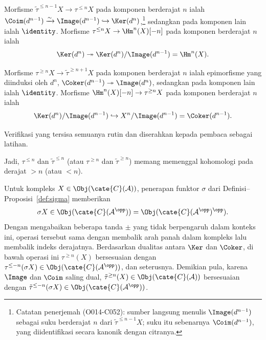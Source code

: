 \begin{bukti}
	Morfisme $\tilde{\tau}^{\leq n-1} X \to \tau^{\leq n} X$ pada komponen
	berderajat $n$ ialah $\Coim(d^{n-1}) \xrightarrow{\sim}
	\Image(d^{n-1}) \hookrightarrow \Ker(d^n)$,\footnote{Catatan penerjemah
	(O014-C052): sumber langsung menulis $\Image(d^{n-1})$ sebagai suku
	berderajat $n$ dari $\tilde{\tau}^{\leq n-1}X$; suku itu sebenarnya
	$\Coim(d^{n-1})$, yang diidentifikasi secara kanonik dengan citranya.}
	sedangkan pada komponen lain ialah $\identity$. Morfisme
	$\tau^{\leq n} X \to \Hm^n(X)[-n]$ pada komponen berderajat $n$ ialah
	\[ \Ker(d^n) \twoheadrightarrow \Ker(d^n)/\Image(d^{n-1}) = \Hm^n(X). \]
	
	Morfisme $\tau^{\geq n} X \to \tilde{\tau}^{\geq n+1} X$ pada komponen
	berderajat $n$ ialah epimorfisme yang diinduksi oleh $d^n$,
	$\Coker(d^{n-1}) \twoheadrightarrow \Image(d^n)$, sedangkan pada komponen
	lain ialah $\identity$. Morfisme
	$\Hm^n(X)[-n] \to \tau^{\geq n} X$ pada komponen berderajat $n$ ialah
	\[ \Ker(d^n)/\Image(d^{n-1}) \hookrightarrow X^n/\Image(d^{n-1}) = \Coker(d^{n-1}). \]
	
	Verifikasi yang tersisa semuanya rutin dan diserahkan kepada pembaca
	sebagai latihan.
\end{bukti}

Jadi, $\tau^{\leq n}$ dan $\tilde{\tau}^{\leq n}$ (atau
$\tau^{\geq n}$ dan $\tilde{\tau}^{\geq n}$) memang memenggal kohomologi
pada derajat $> n$ (atau $< n$).

\begin{catatan}\label{rem:truncation-sigma}
	Untuk kompleks $X \in \Obj(\cate{C}(\mathcal{A}))$, penerapan funktor
	$\sigma$ dari Definisi--Proposisi~\ref{def:sigma} memberikan
	\[
	\sigma X \in \Obj(\cate{C}(\mathcal{A}^{\opp})) =
	\Obj(\cate{C}(\mathcal{A}^{\opp})^{\opp}).
	\]
	Dengan mengabaikan beberapa
	tanda $\pm$ yang tidak berpengaruh dalam konteks ini, operasi tersebut sama
	dengan membalik arah panah dalam kompleks lalu membalik indeks derajatnya.
	Berdasarkan dualitas antara $\Ker$ dan $\Coker$, di bawah operasi ini
	$\tau^{\geq n}(X)$ bersesuaian dengan
	$\tau^{\leq -n}(\sigma X) \in
	\Obj(\cate{C}(\mathcal{A}^{\opp}))$, dan seterusnya. Demikian pula, karena
	$\Image$ dan $\Coim$ saling dual,
	$\tilde{\tau}^{\geq n}(X) \in \Obj(\cate{C}(\mathcal{A}))$ bersesuaian
	dengan $\tilde{\tau}^{\leq -n}(\sigma X) \in
	\Obj(\cate{C}(\mathcal{A}^{\opp}))$.
\end{catatan}

